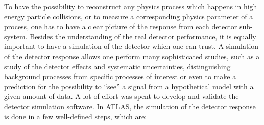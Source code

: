 To have the possibility to reconstruct any physics process which happens in high energy particle collisions, or to measure a corresponding physics parameter of a process,
one has to have a clear picture of the response from each detector sub-system. Besides the understanding of the real detector performance, it is equally important to have 
a simulation of the detector which one can trust. A simulation of the detector response allows one perform many sophisticated studies, such as a study of the detector effects and systematic uncertainties,
distinguishing background processes from specific processes of interest or even to make a prediction for the possibility to ``see'' a signal from a hypothetical model with a given amount of data.
A lot of effort was spent to develop and validate the detector simulation software. In ATLAS, the simulation of the detector response is done in a few well-defined steps, which are:

